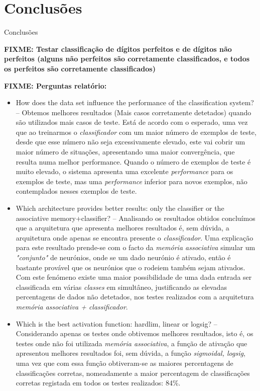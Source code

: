 \documentclass{article}
\begin{document}
\pagebreak

\section{Conclusões}

Conclusões

\textbf{FIXME: Testar classificação de dígitos perfeitos e de dígitos não perfeitos (alguns não perfeitos são corretamente classificados, e todos os perfeitos são corretamente classificados)}


\vspace{.3cm}

\textbf{FIXME: Perguntas relatório:}

\begin{itemize}
\item How does the data set influence the performance of the classification system? -- Obtemos melhores resultados (Mais casos corretamente detetados) quando são utilizados mais casos de teste. Está de acordo com o esperado, uma vez que ao treinarmos o \emph{classificador} com um maior número de exemplos de teste, desde que esse número não seja excessivamente elevado, este vai cobrir um maior número de situações, apresentando uma maior convergência, que resulta numa melhor performance. Quando o número de exemplos de teste é muito elevado, o sistema apresenta uma excelente \emph{performance} para os exemplos de teste, mas uma \emph{performance} inferior para novos exemplos, não contemplados nesses exemplos de teste.

\item Which architecture provides better results: only the classifier or the associative memory+classifier? -- Analisando os resultados obtidos concluímos que a arquitetura que apresenta melhores resultados é, sem dúvida, a arquitetura onde apenas se encontra presente o \emph{classificador}. Uma explicação para este resultado prende-se com o facto da \emph{memória associativa} simular um \emph{"conjunto"} de neurónios, onde se um dado neurónio é ativado, então é bastante provável que os neurónios que o rodeiem também sejam ativados. Com este fenómeno existe uma maior possibilidade de uma dada entrada ser classificada em várias \emph{classes} em simultâneo, justificando as elevadas percentagens de dados não detetados, nos testes realizados com a arquitetura \emph{memória associativa + classificador}.

\item Which is the best activation function: hardlim, linear or logsig? -- Considerando apenas os testes onde obtivemos melhores resultados, isto é, os testes onde não foi utilizada \emph{memória associativa}, a função de ativação que apresentou melhores resultados foi, sem dúvida, a função \emph{sigmoidal, logsig}, uma vez que com essa função obtiveram-se as maiores percentagens de classificações corretas, nomeadamente a maior percentagem de classificações corretas registada em todos os testes realizados: 84\%.


\end{itemize}
\end{document}
